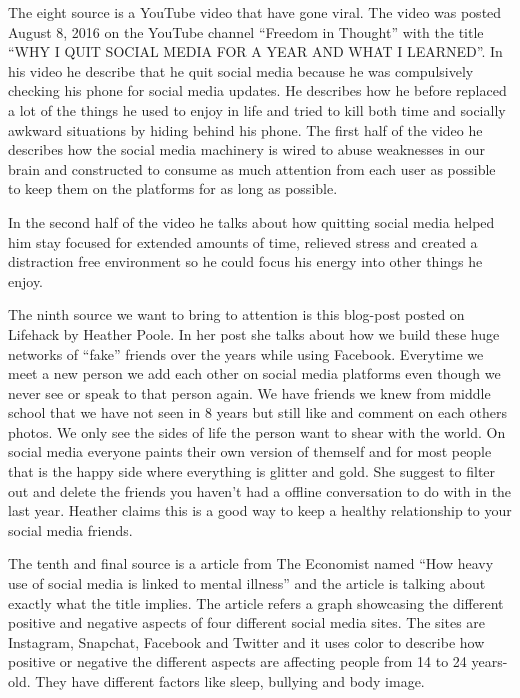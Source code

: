 \documentclass[11pt]{article}
\begin{document}
The eight source \cite{youtube3} is a YouTube video that have gone viral. The video was
posted August 8, 2016 on the YouTube channel “Freedom in Thought” with the title “WHY I
QUIT SOCIAL MEDIA FOR A YEAR AND WHAT I LEARNED”. In his video he describe that he quit
social media because he was compulsively checking his phone for social media updates. He
describes how he before replaced a lot of the things he used to enjoy in life and tried
to kill both time and socially awkward situations by hiding behind his phone. The first
half of the video he describes how the social media machinery is wired to abuse
weaknesses in our brain and constructed to consume as much attention from each user as
possible to keep them on the platforms for as long as possible.

In the second half of the video he talks about how quitting social media helped him stay
focused for extended amounts of time, relieved stress and created a distraction free
environment so he could focus his energy into other things he enjoy.

The ninth source \cite{lifehack} we want to bring to attention is this blog-post posted
on Lifehack by Heather Poole. In her post she talks about how we build these huge
networks of “fake” friends over the years while using Facebook. Everytime we meet a new
person we add each other on social media platforms even though we never see or speak to
that person again. We have friends we knew from middle school that we have not seen in
8 years but still like and comment on each others photos. We only see the sides of life
the person want to shear with the world. On social media everyone paints their own
version of themself and for most people that is the happy side where everything is
glitter and gold. She suggest to filter out and delete the friends you haven’t had a
offline conversation to do with in the last year. Heather claims this is a good way to
keep a healthy relationship to your social media friends.

The tenth and final source \cite{economist} is a article from The Economist named “How
heavy use of social media is linked to mental illness” and the article is talking about
exactly what the title implies. The article refers a graph showcasing the different
positive and negative aspects of four different social media sites. The sites are
Instagram, Snapchat, Facebook and Twitter and it uses color to describe how positive
or negative the different aspects are affecting people from 14 to 24 years-old. They
have different factors like sleep, bullying and body image.
\end{document}
